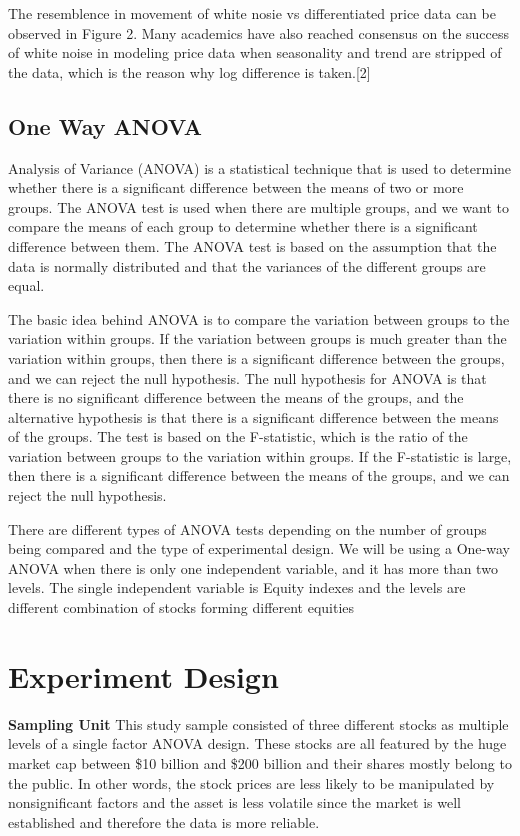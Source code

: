 \documentclass{article}[12pt]
\begin{document}
          The resemblence in movement of white nosie vs differentiated price data can be observed in Figure 2. Many academics have also reached consensus on the success of white noise in modeling price data when seasonality and trend are stripped of the data, which is the reason why log difference is taken.[2]

        \subsection{One Way ANOVA}
        Analysis of Variance (ANOVA) is a statistical technique that is used to determine whether there is a significant difference between the means of two or more groups. The ANOVA test is used when there are multiple groups, and we want to compare the means of each group to determine whether there is a significant difference between them. The ANOVA test is based on the assumption that the data is normally distributed and that the variances of the different groups are equal.

        The basic idea behind ANOVA is to compare the variation between groups to the variation within groups. If the variation between groups is much greater than the variation within groups, then there is a significant difference between the groups, and we can reject the null hypothesis. The null hypothesis for ANOVA is that there is no significant difference between the means of the groups, and the alternative hypothesis is that there is a significant difference between the means of the groups. The test is based on the F-statistic, which is the ratio of the variation between groups to the variation within groups. If the F-statistic is large, then there is a significant difference between the means of the groups, and we can reject the null hypothesis.
        
        There are different types of ANOVA tests depending on the number of groups being compared and the type of experimental design. We will be using a One-way ANOVA when there is only one independent variable, and it has more than two levels. The single independent variable is Equity indexes and the levels are different combination of stocks forming different equities
    
        
    \section{Experiment Design}

        \textbf{Sampling Unit} 
        This study sample consisted of three different stocks as multiple levels of a single factor ANOVA design. These stocks are all featured by the huge market cap between \$10 billion and \$200 billion and their shares mostly belong to the public. In other words, the stock prices are less likely to be manipulated by nonsignificant factors and the asset is less volatile since the market is well established and therefore the data is more reliable.
\end{document}
